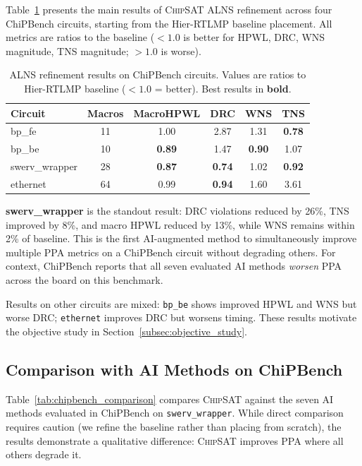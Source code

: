 \documentclass[sigconf,anonymous,review,9pt]{acmart}
\begin{document}
Table~\ref{tab:main_results} presents the main results of \textsc{ChipSAT} ALNS refinement across four ChiPBench circuits, starting from the Hier-RTLMP baseline placement. All metrics are ratios to the baseline ($<1.0$ is better for HPWL, DRC, WNS magnitude, TNS magnitude; $>1.0$ is worse).

\begin{table}[t]
\centering
\caption{ALNS refinement results on ChiPBench circuits. Values are ratios to Hier-RTLMP baseline ($<1.0$ = better). Best results in \textbf{bold}.}
\label{tab:main_results}
\small
\setlength{\tabcolsep}{3pt}
\begin{tabular}{lccccc}
\toprule
Circuit & Macros & MacroHPWL & DRC & WNS & TNS \\
\midrule
bp\_fe & 11 & 1.00 & 2.87 & 1.31 & \textbf{0.78} \\
bp\_be & 10 & \textbf{0.89} & 1.47 & \textbf{0.90} & 1.07 \\
swerv\_wrapper & 28 & \textbf{0.87} & \textbf{0.74} & 1.02 & \textbf{0.92} \\
ethernet & 64 & 0.99 & \textbf{0.94} & 1.60 & 3.61 \\
\bottomrule
\end{tabular}
\end{table}

\textbf{swerv\_wrapper} is the standout result: DRC violations reduced by 26\%, TNS improved by 8\%, and macro HPWL reduced by 13\%, while WNS remains within 2\% of baseline. This is the first AI-augmented method to simultaneously improve multiple PPA metrics on a ChiPBench circuit without degrading others. For context, ChiPBench reports that all seven evaluated AI methods \emph{worsen} PPA across the board on this benchmark.

Results on other circuits are mixed: \texttt{bp\_be} shows improved HPWL and WNS but worse DRC; \texttt{ethernet} improves DRC but worsens timing. These results motivate the objective study in Section~\ref{subsec:objective_study}.

\subsection{Comparison with AI Methods on ChiPBench}
\label{subsec:comparison}

Table~\ref{tab:chipbench_comparison} compares \textsc{ChipSAT} against the seven AI methods evaluated in ChiPBench on \texttt{swerv\_wrapper}. While direct comparison requires caution (we refine the baseline rather than placing from scratch), the results demonstrate a qualitative difference: \textsc{ChipSAT} improves PPA where all others degrade it.
\end{document}
